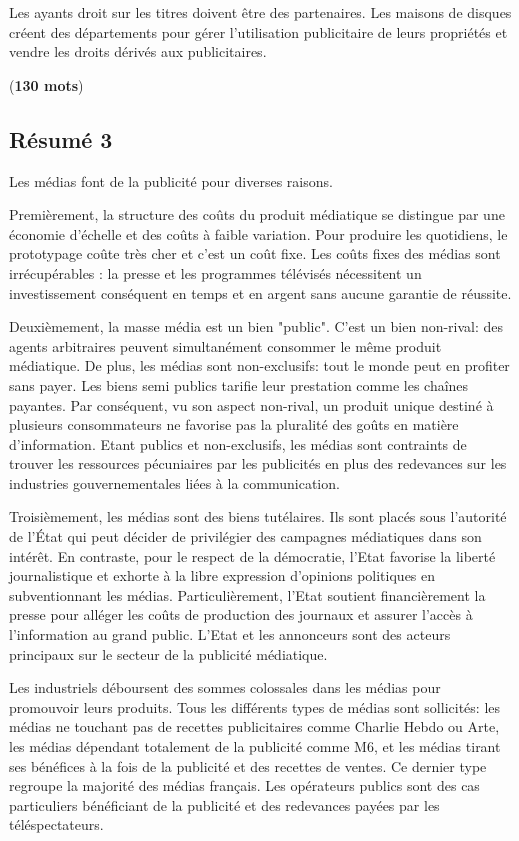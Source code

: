 \documentclass[11pt]{article}
\begin{document}
Les ayants droit sur les titres doivent être des partenaires. Les maisons de disques créent des départements pour gérer l'utilisation publicitaire de leurs propriétés et vendre les droits dérivés aux publicitaires.

(\textbf{130 mots})

\newpage
\subsection{Résumé 3}

Les médias font de la publicité pour diverses raisons.

Premièrement, la structure des coûts du produit médiatique se distingue par une économie d'échelle et des coûts à faible variation. Pour produire les quotidiens, le prototypage coûte très cher et c'est un coût fixe. Les coûts fixes des médias sont irrécupérables : la presse et les programmes télévisés nécessitent un investissement conséquent en temps et en argent sans aucune garantie de réussite.

Deuxièmement, la masse média est un bien "public". C'est un bien non-rival: des agents arbitraires peuvent simultanément consommer le même produit médiatique. De plus, les médias sont non-exclusifs: tout le monde peut en profiter sans payer. Les biens semi publics tarifie leur prestation comme les chaînes payantes.
Par conséquent, vu son aspect non-rival, un produit unique destiné à plusieurs consommateurs ne favorise pas la pluralité des goûts en matière d'information. Etant publics et non-exclusifs, les médias sont contraints de trouver les ressources pécuniaires par les publicités en plus des redevances sur les industries gouvernementales liées à la communication.

Troisièmement, les médias sont des biens tutélaires. Ils sont placés sous l'autorité  de l’État qui peut décider de privilégier des campagnes médiatiques dans son intérêt. En contraste, pour le respect de la démocratie, l'Etat favorise la liberté journalistique et exhorte à la libre expression d'opinions politiques en subventionnant les médias. Particulièrement, l'Etat soutient financièrement la presse  pour alléger les coûts de production des journaux et assurer l'accès à l'information au grand public.
L'Etat et les annonceurs sont des acteurs principaux sur le secteur de la publicité médiatique.

Les industriels déboursent des sommes colossales dans les médias pour promouvoir leurs produits. Tous les différents types de médias sont sollicités: les médias ne touchant pas de recettes publicitaires comme Charlie Hebdo ou Arte, les médias dépendant totalement de la publicité comme M6, et les médias tirant ses bénéfices à la fois de la publicité et des recettes de ventes. Ce dernier type regroupe la majorité des médias français. Les opérateurs publics sont des cas particuliers bénéficiant de la publicité et des redevances payées par les téléspectateurs.
\end{document}
